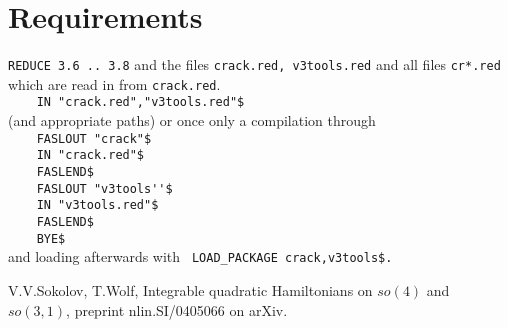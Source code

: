 \documentclass[12pt]{article}
\begin{document}
\section{Requirements}
{\tt REDUCE 3.6 .. 3.8} and 
the files {\tt crack.red, v3tools.red} and 
all files {\tt cr*.red} which are read in from {\tt crack.red}. \\
\verb+    IN "crack.red","v3tools.red"$+ \\
(and appropriate paths) or once only a compilation through \\
\verb+    FASLOUT "crack"$+ \\
\verb+    IN "crack.red"$+ \\
\verb+    FASLEND$+ \\
\verb+    FASLOUT "v3tools''$+ \\
\verb+    IN "v3tools.red"$+ \\
\verb+    FASLEND$+ \\
\verb+    BYE$+ \\
and loading afterwards with \verb+ LOAD_PACKAGE crack,v3tools$.+

\begin{thebibliography}{99}
 V.V.Sokolov, T.Wolf, Integrable quadratic Hamiltonians on 
                 $so(4)$ and $so(3,1)$, preprint nlin.SI/0405066 on arXiv.
\end{thebibliography}
\end{document}
